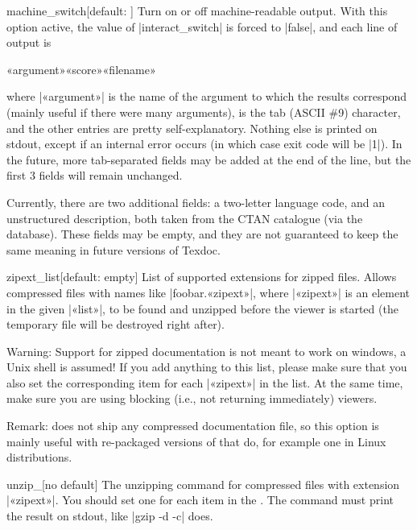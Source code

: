 \documentclass{texdoc-doc}
\begin{document}
\begin{confitem}{machine\_switch}{}[default: ]
Turn on or off machine-readable output. With this option active, the value of
|interact_switch| is forced to |false|, and each line of output is
%
\begin{htcode}
«argument»\metatab«score»\metatab«filename»
\end{htcode}
%
where |«argument»| is the name of the argument to which the results correspond
(mainly useful if there were many arguments), {\metatab} is the tab (ASCII \#9)
character, and the other entries are pretty self-explanatory. Nothing else is
printed on stdout, except if an internal error occurs (in which case exit code
will be |1|). In the future, more tab-separated fields may be added at the end
of the line, but the first 3 fields will remain unchanged.

Currently, there are two additional fields: a two-letter language code, and an
unstructured description, both taken from the CTAN catalogue (via the {\TL}
database). These fields may be empty, and they are not guaranteed to keep the
same meaning in future versions of Texdoc.
\end{confitem}

\begin{confitem}{zipext\_list}{}[default: empty]
List of supported extensions for zipped files. Allows compressed files with
names like |foobar.«zipext»|, where |«zipext»| is an element in the given
|«list»|, to be found and unzipped before the viewer is started (the temporary
file will be destroyed right after).

Warning: Support for zipped documentation is not meant to work on windows, a
Unix shell is assumed! If you add anything to this list, please make sure that
you also set the corresponding  item for each
|«zipext»| in the list. At the same time, make sure you are using blocking
(i.e., not returning immediately) viewers.

Remark: {\TL} does not ship any compressed documentation file, so this option
is mainly useful with re-packaged versions of {\TL} that do, for example one in
Linux distributions.
\end{confitem}

\begin{confitem}{unzip\_}{}[no default]
The unzipping command for compressed files with extension |«zipext»|. You
should set one for each item in the . The command must print
the result on stdout, like |gzip -d -c| does.
\end{confitem}
\end{document}
